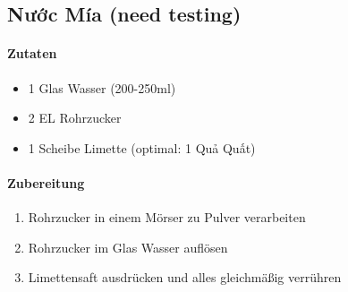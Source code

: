 \newpage
{}
\subsection{Nước Mía (need testing)}
\paragraph{Zutaten}
\begin{itemize}[noitemsep]
	\item 1 Glas Wasser (200-250ml)
	\item 2 EL Rohrzucker
	\item 1 Scheibe Limette (optimal: 1 Quả Quất) 
\end{itemize}
\paragraph{Zubereitung}
\begin{enumerate}[noitemsep]
	\item Rohrzucker in einem Mörser zu Pulver verarbeiten
	\item Rohrzucker im Glas Wasser auflösen
	\item Limettensaft ausdrücken und alles gleichmäßig verrühren
\end{enumerate}
